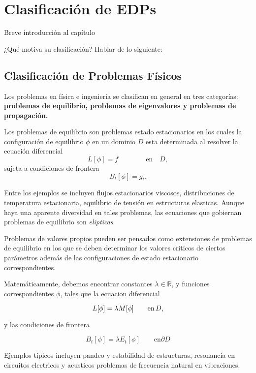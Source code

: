 \chapter{Clasificación de EDPs}\label{cap:clasificación}

Breve introducción al capítulo

¿Qué motiva su clasificación? Hablar de lo siguiente:

\section{Clasificación de Problemas Físicos}

Los problemas en física e ingeniería se clasifican en general en tres categorías: \textbf{problemas de equilibrio, problemas de eigenvalores y problemas de propagación.}

Los problemas de equilibrio son problemas estado estacionarios en los cuales la configuración de equilibrio $\phi$ en un dominio $D$ esta determinada al resolver la ecuación diferencial
\[ L[\phi] = f \qquad \qquad \text{en} \quad D, \]
sujeta a condiciones de frontera
\[ B_t[\phi] = g_t. \]

Entre los ejemplos se incluyen flujos estacionarios viscosos, distribuciones de temperatura estacionaria, equilibrio de tensión en estructuras elasticas. Aunque  haya una aparente diversidad en tales problemas, las ecuaciones que gobiernan problemas de equilibrio son \textit{elipticas}.

Problemas de valores propios pueden ser pensados como extensiones de problemas de equilibrio en los que se deben determinar los valores criticos de ciertos parámetros además de las configuraciones de estado estacionario correspondientes.

Matemáticamente, debemos encontrar constantes $\lambda \in \mathbb{R}$, y funciones correspondientes $\phi$, tales que la ecuacion diferencial

\[ L[\phi] = \lambda M[\phi]  \qquad \text{en} \thinspace D, \]

y las condiciones de frontera

\[
B_t[\phi] = \lambda E_t[\phi]
\qquad \text{en} \partial D \]

Ejemplos típicos incluyen pandeo y estabilidad de estructuras, resonancia en circuitos electricos y acusticos problemas de frecuencia natural en vibraciones.

